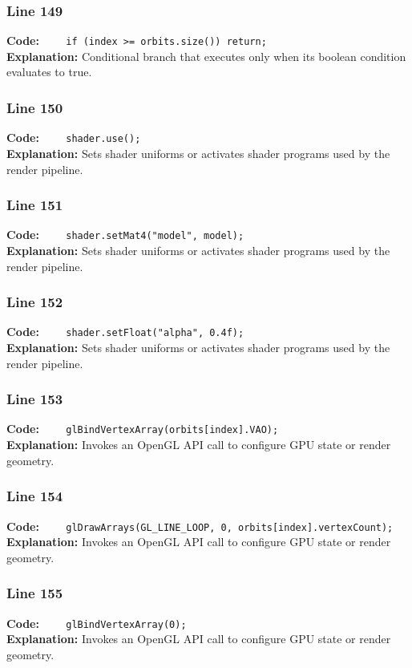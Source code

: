 \documentclass[11pt,a4paper]{article}
\begin{document}
\subsubsection*{Line 149}
\textbf{Code:} \verb|    if (index >= orbits.size()) return;|\\
\textbf{Explanation:} Conditional branch that executes only when its boolean condition evaluates to true.

\subsubsection*{Line 150}
\textbf{Code:} \verb|    shader.use();|\\
\textbf{Explanation:} Sets shader uniforms or activates shader programs used by the render pipeline.

\subsubsection*{Line 151}
\textbf{Code:} \verb|    shader.setMat4("model", model);|\\
\textbf{Explanation:} Sets shader uniforms or activates shader programs used by the render pipeline.

\subsubsection*{Line 152}
\textbf{Code:} \verb|    shader.setFloat("alpha", 0.4f);|\\
\textbf{Explanation:} Sets shader uniforms or activates shader programs used by the render pipeline.

\subsubsection*{Line 153}
\textbf{Code:} \verb|    glBindVertexArray(orbits[index].VAO);|\\
\textbf{Explanation:} Invokes an OpenGL API call to configure GPU state or render geometry.

\subsubsection*{Line 154}
\textbf{Code:} \verb|    glDrawArrays(GL_LINE_LOOP, 0, orbits[index].vertexCount);|\\
\textbf{Explanation:} Invokes an OpenGL API call to configure GPU state or render geometry.

\subsubsection*{Line 155}
\textbf{Code:} \verb|    glBindVertexArray(0);|\\
\textbf{Explanation:} Invokes an OpenGL API call to configure GPU state or render geometry.
\end{document}
